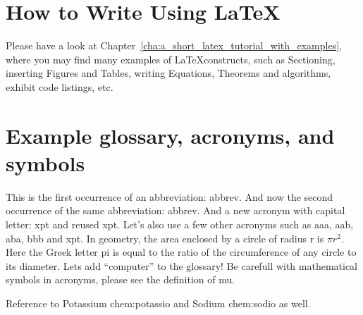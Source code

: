 \section{How to Write Using \LaTeX}
\label{sec:how_to_write_using_latex}

Please have a look at Chapter~\ref{cha:a_short_latex_tutorial_with_examples}, where you may find many examples of \LaTeX constructs, such as Sectioning, inserting Figures and Tables, writing Equations, Theorems and algorithms, exhibit code listings, etc.




\section{Example glossary, acronyms, and symbols}
%
%
This is the first occurrence of an abbreviation: \gls{abbrev}. And now the second occurrence of the same abbreviation: \gls{abbrev}. And a new acronym with capital letter: \Gls{xpt} and reused \gls{xpt}.  Let's also use a few other acronyms such as \gls{aaa}, \gls{aab}, \gls{aba}, \gls{bbb} and \gls{xpt}.
In geometry, the area enclosed by a circle of radius \gls{r} is $\pi r^2$. Here the Greek letter \gls{pi} is equal to the ratio of the circumference of any circle to its diameter.
Lets add ``\gls{computer}'' to the glossary! Be carefull with mathematical symbols in acronyms, please see the definition of \gls{mu}.

Reference to Potassium \gls{chem:potassio} and Sodium \gls{chem:sodio} as well.

%



